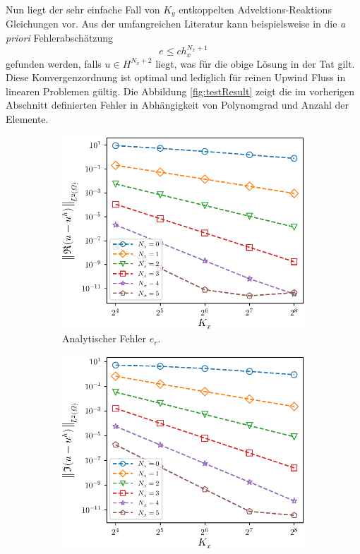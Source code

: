 Nun liegt der sehr einfache Fall von $K_y$ entkoppelten Advektions-Reaktions Gleichungen vor. Aus der umfangreichen Literatur kann beispielsweise in \cite{lesaint1974finite} die \emph{a priori} Fehlerabschätzung
\begin{equation}
  e \leq c h_x^{N_x + 1} \label{eq:optimaleKonvergenz}
\end{equation}
gefunden werden, falls $u \in H^{N_x+2}$ liegt, was für die obige Lösung in der Tat gilt. Diese Konvergenzordnung ist optimal und lediglich für reinen Upwind Fluss in linearen Problemen gültig. Die Abbildung \ref{fig:testResult} zeigt die im vorherigen Abschnitt definierten Fehler in Abhängigkeit von Polynomgrad und Anzahl der Elemente.
\begin{figure}
    \centering
    \begin{subfigure}[b]{0.475\textwidth}
        \centering
        \includegraphics[width=\textwidth]{plots/test1_r.pdf}
        \caption[]%
        {{\small Analytischer Fehler $e_r$.}}
    \end{subfigure}
    \hfill
    \begin{subfigure}[b]{0.475\textwidth}
        \centering
        \includegraphics[width=\textwidth]{plots/test1_i_rel.pdf}

\end{subfigure}
\end{figure}
